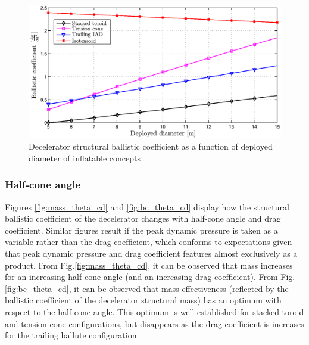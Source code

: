 \begin{figure}[H]
\centering
\includegraphics[width = 1.0\textwidth]{Figure/bc_dia.eps}
\caption{Decelerator structural ballistic coefficient as a function of deployed diameter of inflatable concepts}
\label{fig:bc_dia}
\end{figure}

\subsubsection{Half-cone angle}
Figures \ref{fig:mass_theta_cd} and \ref{fig:bc_theta_cd} display how the structural ballistic coefficient of the decelerator changes with half-cone angle and drag coefficient. Similar figures result if the peak dynamic pressure is taken as a variable rather than the drag coefficient, which conforms to expectations given that peak dynamic pressure and drag coefficient features almost exclusively as a product. From Fig.\ref{fig:mass_theta_cd}, it can be observed that mass increases for an increasing half-cone angle (and an increasing drag coefficient). From  Fig.\ref{fig:bc_theta_cd}, it can be observed that mass-effectiveness (reflected by the ballistic coefficient of the decelerator structural mass) has an optimum with respect to the half-cone angle. This optimum is well established for stacked toroid and tension cone configurations, but disappears as the drag coefficient is increases for the trailing ballute configuration.

